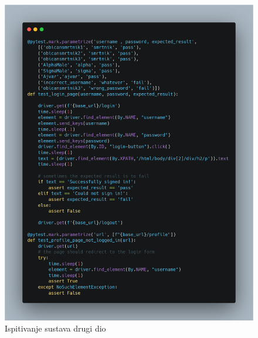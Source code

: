 			\begin{figure}[H]
				\includegraphics[width=\textwidth]{slike/IspitivanjeSustavaDrugiDio.png} %
				\caption{Ispitivanje sustava drugi dio}
				\label{fig:IspitivanjeSustavaDrugiDio} %
			\end{figure}
		
